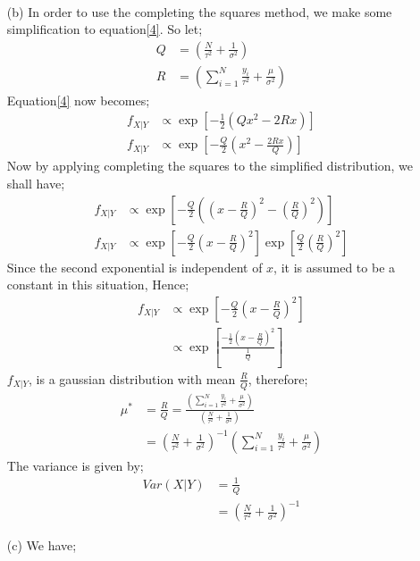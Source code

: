 \documentclass[12pt,a4paper]{article}
\begin{document}
\begin{itemize}
\begin{align}
\end{align}
\item [(b)]
In order to use the completing the squares method, we make some simplification to equation\ref{4}. So let;
\begin{align*}
Q&=\left(\frac{N}{\tau^{2}}+\frac{1}{\sigma^{2}}\right)\\
R&=\left(\sum_{i=1}^{N}\frac{y_{i}}{\tau^{2}}+\frac{\mu}{\sigma^{2}}\right)
\end{align*}
Equation\ref{4} now becomes;
\begin{align*}
f_{X|Y}&\propto \exp\left[-\frac{1}{2}\left(Qx^{2}-2Rx\right)\right]\\
f_{X|Y}&\propto \exp \left[-\frac{Q}{2}\left(x^{2}-\frac{2Rx}{Q}\right)\right]
\end{align*}
Now by applying completing the squares to the simplified distribution, we shall have;
\begin{align*}
f_{X|Y}&\propto \exp\left[-\frac{Q}{2}\left(\left(x-\frac{R}{Q}\right)^{2}-\left(\frac{R}{Q}\right)^{2}\right)\right]\\
f_{X|Y}&\propto\exp\left[-\frac{Q}{2}\left(x-\frac{R}{Q}\right)^{2}\right]\exp\left[\frac{Q}{2}\left(\frac{R}{Q}\right)^{2}\right]
\end{align*}
Since the second exponential is independent of $x$, it is assumed to be a constant in this situation, Hence;
\begin{align*}
f_{X|Y}&\propto \exp\left[-\frac{Q}{2}\left(x-\frac{R}{Q}\right)^{2}\right]\\
&\propto \exp\left[\frac{-\frac{1}{2}\left(x-\frac{R}{Q}\right)^{2}}{\frac{1}{Q}}\right]
\end{align*}
$f_{X|Y}$, is a gaussian distribution with mean $\frac{R}{Q}$, therefore;
\begin{align*}
\mu^{*}&=\frac{R}{Q}=\frac{\left(\sum_{i=1}^{N}\frac{y_{i}}{\tau^{2}}+\frac{\mu}{\sigma^{2}}\right)}{\left(\frac{N}{\tau^{2}}+\frac{1}{\sigma^{2}}\right)}\\
&=\left(\frac{N}{\tau^{2}}+\frac{1}{\sigma^{2}}\right)^{-1}\left(\sum_{i=1}^{N}\frac{y_{i}}{\tau^{2}}+\frac{\mu}{\sigma^{2}}\right)
\end{align*}
The variance is given by;
\begin{align*}
Var(X|Y)&=\frac{1}{Q}\\
&=\left(\frac{N}{\tau^{2}}+\frac{1}{\sigma^{2}}\right)^{-1}
\end{align*}
\item [(c)]
We have;


\end{itemize}
\end{document}
